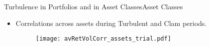 \documentclass{beamer}
\begin{document}
%		

\begin{frame}{Turbulence in Portfolios and in Asset Classes}{Asset Classes}
	\begin{itemize}
		\vspace*{0in}
		\item{Correlations across assets during Turbulent and Clam periods.}
		\vspace*{-0.55in}
		\begin{figure}
			\scalebox{0.8}
			{\hspace*{-1in}\texttt{[image: avRetVolCorr\_assets\_trial.pdf]}}
		\end{figure}
	\end{itemize}
\end{frame}

\end{document}

